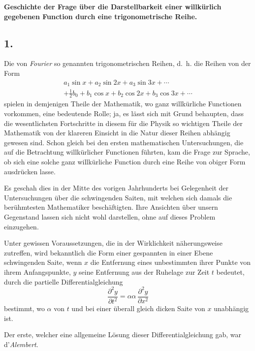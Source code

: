 \documentclass[12pt,a4paper]{article}
\begin{document}
\begin{center}
\textbf{Geschichte der Frage über die Darstellbarkeit einer willkürlich\\gegebenen Function durch eine trigonometrische Reihe.}
\end{center}

\subsection*{1.}

Die von \textit{Fourier} so genannten trigonometrischen Reihen, d.~h. die Reihen von der Form
\begin{multline*}
a_1\sin x + a_2\sin 2x + a_3\sin 3x + \cdots\\
+ \tfrac{1}{2}b_0 + b_1\cos x + b_2\cos 2x + b_3\cos 3x + \cdots
\end{multline*}
spielen in demjenigen Theile der Mathematik, wo ganz willkürliche Functionen vorkommen, eine bedeutende Rolle; ja, es lässt sich mit Grund behaupten, dass die wesentlichsten Fortschritte in diesem für die Physik so wichtigen Theile der Mathematik von der klareren Einsicht in die Natur dieser Reihen abhängig gewesen sind. Schon gleich bei den ersten mathematischen Untersuchungen, die auf die Betrachtung willkürlicher Functionen führten, kam die Frage zur Sprache, ob sich eine solche ganz willkürliche Function durch eine Reihe von obiger Form ausdrücken lasse.

Es geschah dies in der Mitte des vorigen Jahrhunderts bei Gelegenheit der Untersuchungen über die schwingenden Saiten, mit welchen sich damals die berühmtesten Mathematiker beschäftigten. Ihre Ansichten über unsern Gegenstand lassen sich nicht wohl darstellen, ohne auf dieses Problem einzugehen.

Unter gewissen Voraussetzungen, die in der Wirklichkeit näherungsweise zutreffen, wird bekanntlich die Form einer gespannten in einer Ebene schwingenden Saite, wenn $x$ die Entfernung eines unbestimmten ihrer Punkte von ihrem Anfangspunkte, $y$ seine Entfernung aus der Ruhelage zur Zeit $t$ bedeutet, durch die partielle Differentialgleichung
\[ \frac{\partial^2 y}{\partial t^2} = \alpha\alpha\,\frac{\partial^2 y}{\partial x^2} \]
bestimmt, wo $\alpha$ von $t$ und bei einer überall gleich dicken Saite von $x$ unabhängig ist.

Der erste, welcher eine allgemeine Lösung dieser Differentialgleichung gab, war d'\textit{Alembert}.
\end{document}
